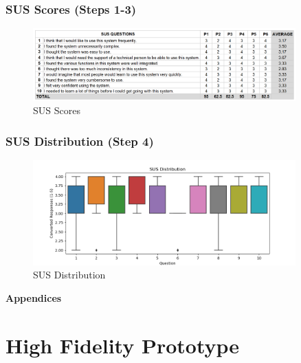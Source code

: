 \documentclass[a4 paper, 12pt]{article}
\begin{document}
    \subsubsection*{SUS Scores (Steps 1-3)}
        \begin{figure} [H]
            \centering
            \includegraphics[width=0.9\textwidth, frame]
                {./Med_Fidelity/Med_SUS_Scores.PNG}  
            \caption{SUS Scores}
        \end{figure}
    
    \subsubsection*{SUS Distribution (Step 4)}
        \begin{figure} [H]
            \centering
            \includegraphics[width=0.9\textwidth, frame]
                {./Med_Fidelity/Med_SUS_Distrib.PNG}  
            \caption{SUS Distribution}
        \end{figure}


    \pagebreak     
    
                \label{sec:B.8}

\pagebreak
\begin{center}
    \Huge \textbf{Appendices}
    \section{High Fidelity Prototype}
\end{center}
\end{document}
